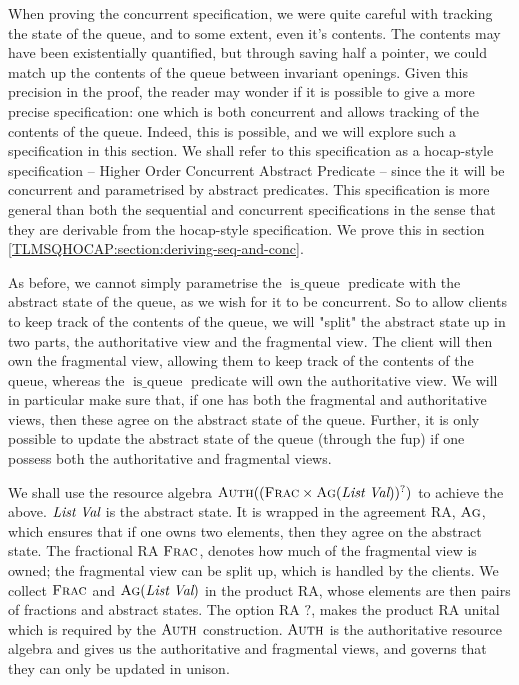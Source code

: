 \documentclass[a4paper, 11pt]{report}
\newcommand{\isqueue}{\operatorname{is\_queue}}
\begin{document}
When proving the concurrent specification, we were quite careful with tracking the state of the queue, and to some extent, even it's contents. The contents may have been existentially quantified, but through saving half a pointer, we could match up the contents of the queue between invariant openings. Given this precision in the proof, the reader may wonder if it is possible to give a more precise specification: one which is both concurrent and allows tracking of the contents of the queue. Indeed, this is possible, and we will explore such a specification in this section. We shall refer to this specification as a hocap-style specification -- Higher Order Concurrent Abstract Predicate -- since the it will be concurrent and parametrised by abstract predicates. This specification is more general than both the sequential and concurrent specifications in the sense that they are derivable from the hocap-style specification. We prove this in section \ref{TLMSQHOCAP:section:deriving-seq-and-conc}.

As before, we cannot simply parametrise the $\isqueue$ predicate with the abstract state of the queue, as we wish for it to be concurrent. So to allow clients to keep track of the contents of the queue, we will "split" the abstract state up in two parts, the authoritative view and the fragmental view. The client will then own the fragmental view, allowing them to keep track of the contents of the queue, whereas the $\isqueue$ predicate will own the authoritative view. We will in particular make sure that, if one has both the fragmental and authoritative views, then these agree on the abstract state of the queue. Further, it is only possible to update the abstract state of the queue (through the fup) if one possess both the authoritative and fragmental views.

We shall use the resource algebra $\authm(\option{(\fracm \times \agm(\List\ \Val))})$ to achieve the above. $\List\ \Val$ is the abstract state. It is wrapped in the agreement RA, $\textsc{Ag}$, which ensures that if one owns two elements, then they agree on the abstract state. The fractional RA $\textsc{Frac}$, denotes how much of the fragmental view is owned; the fragmental view can be split up, which is handled by the clients. We collect $\textsc{Frac}$ and $\textsc{Ag}(\textit{List}\ \textit{Val})$ in the product RA, whose elements are then pairs of fractions and abstract states.
The option RA $?$, makes the product RA unital which is required by the $\textsc{Auth}$ construction. $\textsc{Auth}$ is the authoritative resource algebra and gives us the authoritative and fragmental views, and governs that they can only be updated in unison.
\end{document}
